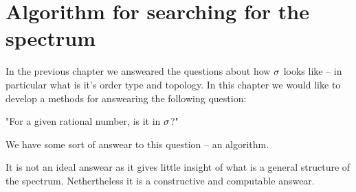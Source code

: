 \chapter{Algorithm for searching for the spectrum}\label{Searching the spectrum}

In the previous chapter we answeared the questions about how ${\sigma}$ looks like -- in particular 
what is it's order type and topology. In this chapter we would like to develop a 
methods for answearing the 
following question: 

"For a given rational number, is it in ${\sigma}$?" 

We have some sort of answear to this question -- an algorithm.

It is not an ideal answear as it gives little insight of what is a general structure 
of the spectrum. Nethertheless it is a constructive and computable answear. 











